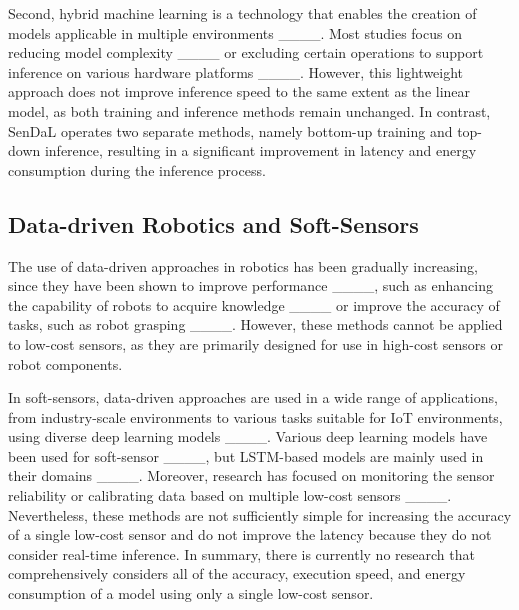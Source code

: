 Second, hybrid machine learning is a technology that enables the creation of models applicable in multiple environments ____. Most studies focus on reducing model complexity ____ or excluding certain operations to support inference on various hardware platforms ____. However, this lightweight approach does not improve inference speed to the same extent as the linear model, as both training and inference methods remain unchanged. In contrast, SenDaL operates two separate methods, namely bottom-up training and top-down inference, resulting in a significant improvement in latency and energy consumption during the inference process.


\subsection{Data-driven Robotics and Soft-Sensors}
The use of data-driven approaches in robotics has been gradually increasing, since they have been shown to improve performance ____, such as enhancing the capability of robots to acquire knowledge ____ or improve the accuracy of tasks, such as robot grasping ____. However, these methods cannot be applied to low-cost sensors, as they are primarily designed for use in high-cost sensors or robot components.


In soft-sensors, data-driven approaches are used in a wide range of applications, from industry-scale environments to various tasks suitable for IoT environments, using diverse deep learning models ____. Various deep learning models have been used for soft-sensor ____, but LSTM-based models are mainly used in their domains ____. Moreover, research has focused on monitoring the sensor reliability or calibrating data based on multiple low-cost sensors ____. Nevertheless, these methods are not sufficiently simple for increasing the accuracy of a single low-cost sensor and do not improve the latency because they do not consider real-time inference. In summary, there is currently no research that comprehensively considers all of the accuracy, execution speed, and energy consumption of a model using only a single low-cost sensor.
